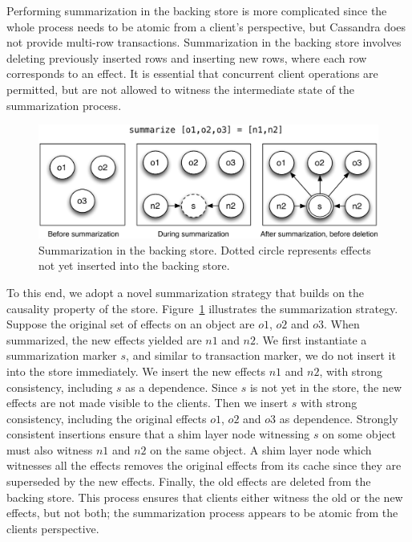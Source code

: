 Performing summarization in the backing store is more complicated since the
whole process needs to be atomic from a client's perspective, but Cassandra
does not provide multi-row transactions. Summarization in the backing store
involves deleting previously inserted rows and inserting new rows, where each
row corresponds to an effect. It is essential that concurrent client operations
are permitted, but are not allowed to witness the intermediate state of the
summarization process.

\begin{figure}
\begin{center}
\includegraphics[width=\columnwidth]{Figures/SumDisk}
\end{center}
\caption{Summarization in the backing store. Dotted circle represents effects
not yet inserted into the backing store.}
\label{fig:impl_sum_disk}
\end{figure}

To this end, we adopt a novel summarization strategy that builds on the
causality property of the store. Figure~\ref{fig:impl_sum_disk} illustrates the
summarization strategy. Suppose the original set of effects on an object are
$o1$, $o2$ and $o3$. When summarized, the new effects yielded are $n1$ and
$n2$. We first instantiate a summarization marker $s$, and similar to
transaction marker, we do not insert it into the store immediately. We insert
the new effects $n1$ and $n2$, with strong consistency, including $s$ as a
dependence. Since $s$ is not yet in the store, the new effects are not made
visible to the clients. Then we insert $s$ with strong consistency, including
the original effects $o1$, $o2$ and $o3$ as dependence. Strongly consistent
insertions ensure that a shim layer node witnessing $s$ on some object must
also witness $n1$ and $n2$ on the same object. A shim layer node which
witnesses all the effects removes the original effects from its cache since
they are superseded by the new effects. Finally, the old effects are deleted
from the backing store. This process ensures that clients either witness the
old or the new effects, but not both; the summarization process appears to be
atomic from the clients perspective.
